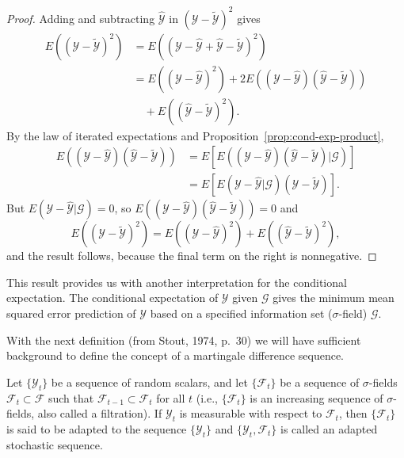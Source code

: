 \begin{proof}
Adding and subtracting $\hat{\mathcal{Y}}$ in $(\mathcal{Y} - \tilde{\mathcal{Y}})^2$ gives
\begin{align*}
E((\mathcal{Y} - \tilde{\mathcal{Y}})^2) &= E((\mathcal{Y} - \hat{\mathcal{Y}} + \hat{\mathcal{Y}} - \tilde{\mathcal{Y}})^2) \\
&= E((\mathcal{Y} - \hat{\mathcal{Y}})^2) + 2E((\mathcal{Y} - \hat{\mathcal{Y}})(\hat{\mathcal{Y}} - \tilde{\mathcal{Y}})) \\
&\quad + E((\hat{\mathcal{Y}} - \tilde{\mathcal{Y}})^2).
\end{align*}
By the law of iterated expectations and Proposition~\ref{prop:cond-exp-product},
\begin{align*}
E((\mathcal{Y} - \hat{\mathcal{Y}})(\hat{\mathcal{Y}} - \tilde{\mathcal{Y}})) &= E[E((\mathcal{Y} - \hat{\mathcal{Y}})(\hat{\mathcal{Y}} - \tilde{\mathcal{Y}})|\mathcal{G})] \\
&= E[E(\mathcal{Y} - \hat{\mathcal{Y}}|\mathcal{G})(\hat{\mathcal{Y}} - \tilde{\mathcal{Y}})].
\end{align*}
But $E(\mathcal{Y} - \hat{\mathcal{Y}}|\mathcal{G}) = 0$, so $E((\mathcal{Y} - \hat{\mathcal{Y}})(\hat{\mathcal{Y}} - \tilde{\mathcal{Y}})) = 0$ and
\[
E((\mathcal{Y} - \tilde{\mathcal{Y}})^2) = E((\mathcal{Y} - \hat{\mathcal{Y}})^2) + E((\hat{\mathcal{Y}} - \tilde{\mathcal{Y}})^2),
\]
and the result follows, because the final term on the right is nonnegative. \qedhere
\end{proof}

This result provides us with another interpretation for the conditional expectation. The conditional expectation of $\mathcal{Y}$ given $\mathcal{G}$ gives the minimum mean squared error prediction of $\mathcal{Y}$ based on a specified information set ($\sigma$-field) $\mathcal{G}$.

With the next definition (from Stout, 1974, p.~30) we will have sufficient background to define the concept of a martingale difference sequence.

\begin{definition}\label{def:filtration}
Let $\{\mathcal{Y}_t\}$ be a sequence of random scalars, and let $\{\mathcal{F}_t\}$ be a sequence of $\sigma$-fields $\mathcal{F}_t \subset \mathcal{F}$ such that $\mathcal{F}_{t-1} \subset \mathcal{F}_t$ for all $t$ (i.e., $\{\mathcal{F}_t\}$ is an increasing sequence of $\sigma$-fields, also called a filtration). If $\mathcal{Y}_t$ is measurable with respect to $\mathcal{F}_t$, then $\{\mathcal{F}_t\}$ is said to be adapted to the sequence $\{\mathcal{Y}_t\}$ and $\{\mathcal{Y}_t, \mathcal{F}_t\}$ is called an adapted stochastic sequence.
\end{definition}

